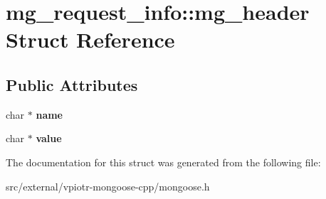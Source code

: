 \hypertarget{structmg__request__info_1_1mg__header}{\section{mg\-\_\-request\-\_\-info\-:\-:mg\-\_\-header Struct Reference}
\label{structmg__request__info_1_1mg__header}
}
\subsection*{Public Attributes}
\begin{DoxyCompactItemize}
\item 
\hypertarget{structmg__request__info_1_1mg__header_ae1537e652f4407bf44deb6bad278003d}{char $\ast$ {\bfseries name}}\label{structmg__request__info_1_1mg__header_ae1537e652f4407bf44deb6bad278003d}

\item 
\hypertarget{structmg__request__info_1_1mg__header_a90f057013be658006fbc42c884f85a9f}{char $\ast$ {\bfseries value}}\label{structmg__request__info_1_1mg__header_a90f057013be658006fbc42c884f85a9f}

\end{DoxyCompactItemize}


The documentation for this struct was generated from the following file\-:\begin{DoxyCompactItemize}
\item 
src/external/vpiotr-\/mongoose-\/cpp/mongoose.\-h\end{DoxyCompactItemize}
